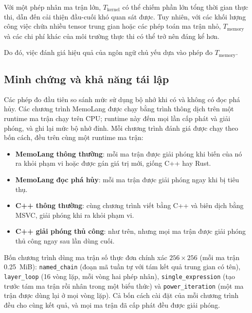 \documentclass[a4paper]{article}
\begin{document}
	Với một phép nhân ma trận lớn, $T_{\mathrm{kernel}}$ có thể chiếm phần lớn tổng thời gian thực thi, dẫn đến cải thiện đầu-cuối khó quan sát được. Tuy nhiên, với các khối lượng công việc chứa nhiều tensor trung gian hoặc các phép toán ma trận nhỏ, $T_{\mathrm{memory}}$ và các chi phí khác của môi trường thực thi có thể trở nên đáng kể hơn.
	
	Do đó, việc đánh giá hiệu quả của ngôn ngữ chủ yếu dựa vào phép đo $T_{\mathrm{memory}}$.
	
	
	\subsection{Minh chứng và khả năng tái lập}
	\label{sec:evidence}
	
	Các phép đo đầu tiên so sánh mức sử dụng bộ nhớ khi có và không có đọc phá hủy. Các chương trình MemoLang được chạy bằng trình thông dịch trên một runtime ma trận chạy trên CPU; runtime này đếm mọi lần cấp phát và giải phóng, và ghi lại mức bộ nhớ đỉnh. Mỗi chương trình đánh giá được chạy theo bốn cách, đều trên cùng một runtime ma trận:
	\begin{itemize}
		\item \textbf{MemoLang thông thường}: mỗi ma trận được giải phóng khi biến của nó ra khỏi phạm vi hoặc được gán giá trị mới, giống C++ hay Rust.
		\item \textbf{MemoLang đọc phá hủy}: mỗi ma trận được giải phóng ngay khi bị tiêu thụ.
		\item \textbf{C++ thông thường}: cùng chương trình viết bằng C++ và biên dịch bằng MSVC, giải phóng khi ra khỏi phạm vi.
		\item \textbf{C++ giải phóng thủ công}: như trên, nhưng mọi ma trận được giải phóng thủ công ngay sau lần dùng cuối.
	\end{itemize}
	Bốn chương trình dùng ma trận số thực đơn chính xác $256 \times 256$ (mỗi ma trận 0.25~MiB): \texttt{named\_chain} (đoạn mã tuần tự với tám kết quả trung gian có tên), \texttt{layer\_loop} (16 vòng lặp, mỗi vòng hai phép nhân), \texttt{single\_expression} (tạo trước tám ma trận rồi nhân trong một biểu thức) và \texttt{power\_iteration} (một ma trận được dùng lại ở mọi vòng lặp). Cả bốn cách cài đặt của mỗi chương trình đều cho cùng kết quả, và mọi ma trận đã cấp phát đều được giải phóng.
\end{document}
